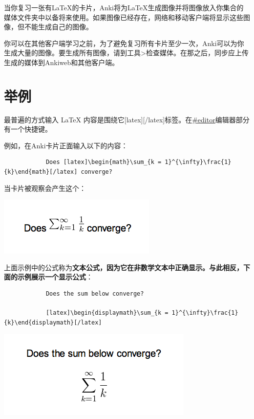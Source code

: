 \documentclass[a4paper]{book}
\begin{document}
		当你复习一张有LaTeX的卡片，Anki将为LaTeX生成图像并将图像放入你集合的媒体文件夹中以备将来使用。如果图像已经存在，网络和移动客户端将显示这些图像，但不能生成自己的图像。
		
		你可以在其他客户端学习之前，为了避免复习所有卡片至少一次，Anki可以为你生成大量的图像。要生成所有图像，请到工具>检查媒体。在那之后，同步应上传生成的媒体到Ankiweb和其他客户端。
		
		\section{举例}
		
		最普遍的方式输入 LaTeX 内容是围绕它[latex][/latex]标签。在\url{#editor}编辑器部分有一个快捷键。
		
		例如，在Anki卡片正面输入以下的内容：
		
		\begin{shaded}\begin{verbatim}
			Does [latex]\begin{math}\sum_{k = 1}^{\infty}\frac{1}{k}\end{math}[/latex] converge?
			\end{verbatim}\end{shaded}
		
		当卡片被观察会产生这个：
		
		\includegraphics{figures/convergence-question.png}
		
		上面示例中的公式称为\textbf{文本公式，因为它在非数学文本中正确显示。与此相反，下面的示例展示一个显示公式}：
		
		\begin{shaded}\begin{verbatim}
			Does the sum below converge?
			
			[latex]\begin{displaymath}\sum_{k = 1}^{\infty}\frac{1}{k}\end{displaymath}[/latex]
			\end{verbatim}\end{shaded}
		
		\includegraphics{figures/convergence-question-2.png}
		
\end{document}
